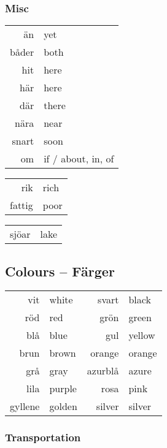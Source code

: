 \documentclass[14pt]{refcard} %
\begin{document}
\subsubsection{Misc}

\begin{tabular}{rl}
än    & yet  \\
båder & both \\
hit   & here \\
här   & here \\
där   & there \\
nära  & near \\
snart & soon \\
om    & if / about, in, of \\
\end{tabular}

\begin{tabular}{rl}
rik & rich \\
fattig & poor \\
\end{tabular}

\begin{tabular}{rl}
sjöar & lake \\
\end{tabular}


\subsection{Colours -- Färger}

\begin{tabular}{rl rl}
vit     & white  & svart   & black  \\
röd     & red    & grön    & green  \\
blå     & blue   & gul     & yellow \\
brun    & brown  & orange  & orange \\
grå     & gray   & azurblå & azure  \\
lila    & purple & rosa    & pink   \\
gyllene & golden & silver  & silver \\
\end{tabular}


\subsubsection{Transportation}
\end{document}
